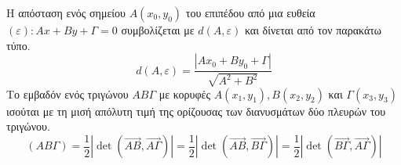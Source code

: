 \documentclass[twoside,nofonts,internet,shmeiwseis]{thewria}
\begin{document}
\thewrhmata
{}
Η απόσταση ενός σημείου $ A(x_0,y_0) $ του επιπέδου από μια ευθεία $(\varepsilon) : Ax+By+\varGamma=0 $ συμβολίζεται με $ d(A,\varepsilon) $ και δίνεται από τον παρακάτω τύπο.
\[ d(A,\varepsilon)=\frac{|Ax_0+By_0+\varGamma|}{\sqrt{A^2+B^2}} \]
Το εμβαδόν ενός τριγώνου $ AB\varGamma $ με κορυφές $ A(x_1,y_1),B(x_2,y_2) $ και $ \varGamma(x_3,y_3) $ ισούται με τη μισή απόλυτη τιμή της ορίζουσας των διανυσμάτων δύο πλευρών του τριγώνου.
\[ (AB\varGamma)=\frac{1}{2}\left|\det{(\overrightarrow{AB},\overrightarrow{A\varGamma})} \right|=\frac{1}{2}\left|\det{(\overrightarrow{AB},\overrightarrow{B\varGamma})} \right|=\frac{1}{2}\left|\det{(\overrightarrow{B\varGamma},\overrightarrow{A\varGamma})} \right| \]
\end{document}

